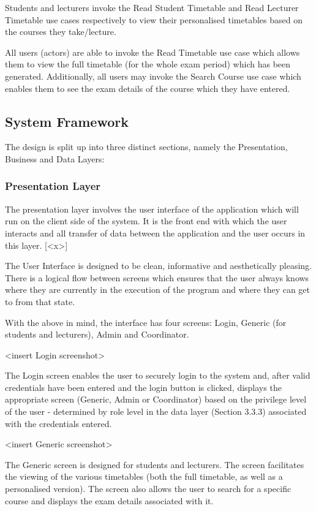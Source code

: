 \documentclass{article}
\begin{document}
Students and lecturers invoke the Read Student Timetable and Read Lecturer Timetable use cases respectively to view their personalised timetables based on the courses they take/lecture.

All users (actors) are able to invoke the Read Timetable use case which allows them to view the full timetable (for the whole exam period) which has been generated. Additionally, all users may invoke the Search Course use case which enables them to see the exam details of the course which they have entered.

\subsection{System Framework}
The design is split up into three distinct sections, namely the Presentation, Business and Data Layers: 

\subsubsection{Presentation Layer}
The presentation layer involves the user interface of the application which will run on the client side of the system. It is the front end with which the user
interacts and all transfer of data between the application and the user occurs in this layer. [<x>]

The User Interface is designed to be clean, informative and aesthetically pleasing. There is a logical flow
between screens which ensures that the user always knows where they are currently in the execution of
the program and where they can get to from that state.

With the above in mind, the interface has four screens: Login, Generic (for students and lecturers), Admin and Coordinator.

<insert Login screenshot> 

The Login screen enables the user to securely login to the system and, after valid credentials have been entered and the login button is clicked,  displays the appropriate screen (Generic, Admin or Coordinator) based on the privilege level of the user - determined by role level in the data layer (Section 3.3.3) associated with the credentials entered.   

<insert Generic screenshot> 

The Generic screen is designed for students and lecturers. The screen facilitates the viewing of the various timetables (both the full timetable, as well as a personalised version). The screen also allows the user to search for a specific course and displays the exam details associated with it.
\end{document}
